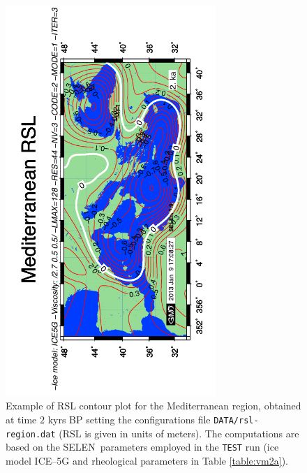 \documentclass[11pt,fleqn,a4paper,titlepage]{article}
\newcommand\selen{\textsf{SELEN~}}
\begin{document}
\begin{figure}[h]
\begin{center}
\vspace{0cm}
\noindent\includegraphics[width=0.71\textwidth, angle=0]{./Figures/rslc-map.png}
\vspace{0cm}
\caption[Holocene RSL in the Mediterranean Sea]{\small{Example of RSL contour plot for the Mediterranean region, obtained at time $2$ kyrs BP setting the configurations file \texttt{DATA/rsl-region.dat} (RSL is given in units of meters). The computations are based on the \selen parameters employed in the \texttt{TEST} run (ice model ICE--5G and rheological parameters in Table \ref{table:vm2a})}.}
\label{fig:med-rslc}
\end{center}
\end{figure}
\newpage
\end{document}
